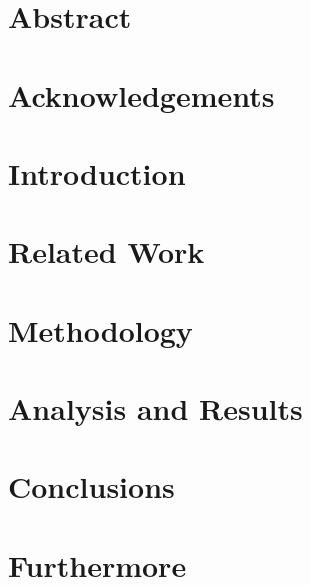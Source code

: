 \documentclass[
    paper=a4,
    oneside,
    fontsize=19pt
    ]{book}
\begin{document}
\frontmatter 



\chapter{Abstract}
    
    
    
\chapter{Acknowledgements}
    


\tableofcontents

    


\mainmatter


\chapter{Introduction}
    

    
\chapter{Related Work}
    
    
    
\chapter{Methodology}
    
    

\chapter{Analysis and Results}
    
    
    
\chapter{Conclusions}
    


\chapter{Furthermore}
    


\appendix
    
    
    
\printbibliography %
    
\end{document}
